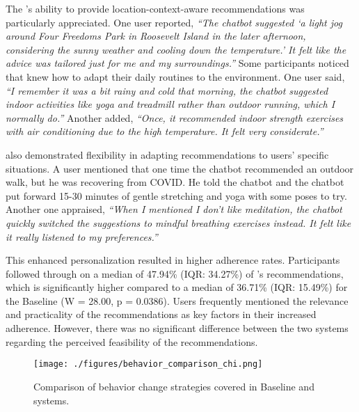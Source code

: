 The \name{}'s ability to provide location-context-aware recommendations was particularly appreciated. One user reported, \textit{``The chatbot suggested `a light jog around Four Freedoms Park in Roosevelt Island in the later afternoon, considering the sunny weather and cooling down the temperature.' It felt like the advice was tailored just for me and my surroundings.''}
Some participants noticed that \name{} knew how to adapt their daily routines to the environment.
One user said, \textit{``I remember it was a bit rainy and cold that morning, the chatbot suggested indoor activities like yoga and treadmill rather than outdoor running, which I normally do.''}
Another added, \textit{``Once, it recommended indoor strength exercises with air conditioning due to the high temperature. It felt very considerate.''}

\name{} also demonstrated flexibility in adapting recommendations to users' specific situations. 
A user mentioned that one time the chatbot recommended an outdoor walk, but he was recovering from COVID. He told the chatbot and the chatbot put forward 15-30 minutes of gentle stretching and yoga with some poses to try.
Another one appraised, \textit{``When I mentioned I don't like meditation, the chatbot quickly switched the suggestions to mindful breathing exercises instead. It felt like it really listened to my preferences.''}

This enhanced personalization resulted in higher adherence rates. 
Participants followed through on a median of 47.94\% (IQR: 34.27\%) of \name{}'s recommendations, which is significantly higher compared to a median of 36.71\% (IQR: 15.49\%) for the Baseline (W = 28.00, p = 0.0386).
Users frequently mentioned the relevance and practicality of the recommendations as key factors in their increased adherence.
However, there was no significant difference between the two systems regarding the perceived feasibility of the recommendations.



\begin{figure}[ht]
\centering
\texttt{[image: ./figures/behavior\_comparison\_chi.png]}
\caption{Comparison of behavior change strategies covered in Baseline and \name{} systems.}
\label{fig:multiple_choice_comparison}
\end{figure}

